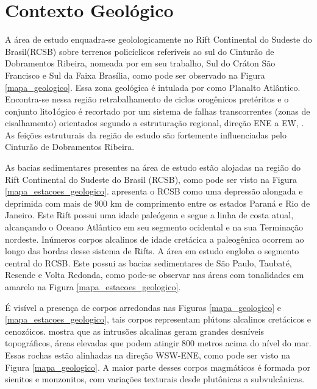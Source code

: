 \chapter{Contexto Geológico}

A área de estudo enquadra-se geolologicamente no Rift Continental do Sudeste do Brasil(RCSB) sobre terrenos policíclicos referíveis ao sul do Cinturão de Dobramentos Ribeira, nomeada por \cite{Riccomini_1989} em seu trabalho, Sul do Cráton São Francisco e Sul da Faixa Brasília, como pode ser observado na Figura \ref{mapa_geologico}. Essa zona geológica é intulada por \cite{Almeida_Carneiro_1998} como Planalto Atlântico. Encontra-se nessa região retrabalhamento de ciclos orogênicos pretéritos e o conjunto lito1ógico é recortado por um sistema de falhas transcorrentes (zonas de cisalhamento) orientados segundo a estruturação regional, direção ENE a EW, \cite{Hasui_Sadowski_1976}. As feições estruturais da região de estudo são fortemente influenciadas pelo Cinturão de Dobramentos Ribeira.

As bacias sedimentares presentes na área de estudo estão alojadas na região do Rift Continental do Sudeste do Brasil (RCSB), como pode ser visto na Figura \ref{mapa_estacoes_geologico}. \cite{Riccomini_1989} apresenta o RCSB como uma depressão alongada e deprimida com mais de 900 km de comprimento entre os estados Paraná e Rio de Janeiro. Este Rift possui uma idade paleógena e segue a linha de costa atual, alcançando o Oceano Atlântico em seu segmento ocidental e na sua Terminação nordeste. Inúmeros corpos alcalinos de idade cretácica a paleogênica ocorrem ao longo das bordas desse sistema de Rifts. A área em estudo engloba o segmento central do RCSB. Este possui as bacias sedimentares de São Paulo, Taubaté, Resende e Volta Redonda, como pode-se observar nas áreas com tonalidades em amarelo na Figura \ref{mapa_estacoes_geologico}. 

É visível a presença de corpos arredondas nas Figuras \ref{mapa_geologico} e \ref{mapa_estacoes_geologico}, tais corpos representam plútons alcalinos cretácicos e cenozóicos. \cite{MOTA_2012} mostra que as intrusões alcalinas geram grandes desníveis topográficos, áreas elevadas que podem atingir 800 metros acima do nível do mar. Essas rochas estão alinhadas na direção WSW-ENE, como pode ser visto na Figura \ref{mapa_geologico}. A maior parte desses corpos magmáticos é formada por sienitos e monzonitos, com variações texturais desde plutônicas a subvulcânicas.

